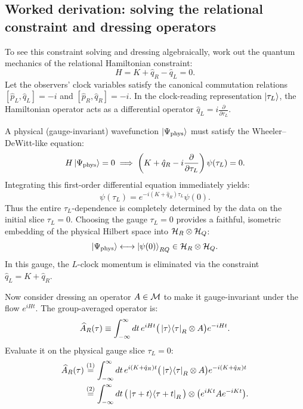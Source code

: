 \subsection*{Worked derivation: solving the relational constraint and dressing operators}

To see this constraint solving and dressing algebraically, work out the quantum mechanics of the relational
Hamiltonian constraint:
\[
H = K + \hat q_R - \hat q_L = 0 .
\]
Let the observers' clock variables satisfy the canonical commutation relations $[\hat p_L, \hat q_L] = -i$ and
$[\hat p_R, \hat q_R] = -i$. In the clock-reading representation $\ket{\tau_L}$, the Hamiltonian operator acts
as a differential operator $\hat q_L = i \frac{\partial}{\partial \tau_L}$.

A physical (gauge-invariant) wavefunction $\ket{\Psi_{\text{phys}}}$ must satisfy the Wheeler--DeWitt-like
equation:
\[
H \ket{\Psi_{\text{phys}}} = 0 \implies \left(K + \hat q_R - i \frac{\partial}{\partial \tau_L}\right)
\psi(\tau_L) = 0 .
\]
Integrating this first-order differential equation immediately yields:
\[
\psi(\tau_L) = e^{-i(K + \hat q_R)\tau_L} \psi(0) .
\]
Thus the entire $\tau_L$-dependence is completely determined by the data on the initial slice $\tau_L = 0$.
Choosing the gauge $\tau_L = 0$ provides a faithful, isometric embedding of the physical Hilbert space into
$\mathcal{H}_R \otimes \mathcal{H}_Q$:
\[
\ket{\Psi_{\text{phys}}} \longleftrightarrow \ket{\psi(0)}_{RQ} \in \mathcal{H}_R \otimes \mathcal{H}_Q .
\]
In this gauge, the $L$-clock momentum is eliminated via the constraint $\hat q_L = K + \hat q_R$.

Now consider dressing an operator $A \in \mathcal{M}$ to make it gauge-invariant under the flow $e^{i H t}$. The
group-averaged operator is:
\[
\widehat A_R(\tau) \equiv \int_{-\infty}^\infty dt\, e^{i H t} \big(\ket\tau\!\bra\tau_R \otimes A\big)
e^{-i H t} .
\]
Evaluate it on the physical gauge slice $\tau_L = 0$:
\begin{align}
\widehat A_R(\tau)
&\overset{(1)}{=} \int_{-\infty}^\infty dt\, e^{i(K + \hat q_R)t} \big(\ket\tau\!\bra\tau_R \otimes A\big)
e^{-i(K + \hat q_R)t} \notag\\
&\overset{(2)}{=} \int_{-\infty}^\infty dt\, \big(\ket{\tau + t}\!\bra{\tau + t}_R\big) \otimes \big(e^{i K t} A
e^{-i K t}\big) . \notag
\end{align}
\quad
{}

